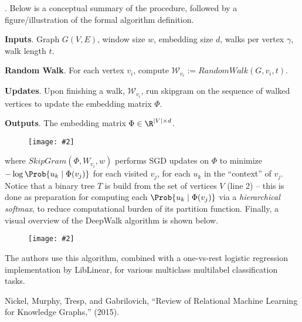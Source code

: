 \documentclass[11pt]{article}
\newcommand\myfig[2][0.3\textwidth]{\begin{figure}[h!]\centering\texttt{[image: \#2]}\end{figure}}
\newcommand\myspace[1][]{\vspace{#1\bigskipamount}}
\newcommand\p{\Needspace{10\baselineskip} \noindent}
\begin{document}
\myspace
\p {}. Below is a conceptual summary of the procedure, followed by a figure/illustration of the formal algorithm definition.
\begin{compactenum}
	\item \textbf{Inputs}. Graph $G(V, E)$, window size $w$, embedding size $d$, walks per vertex $\gamma$, walk length $t$. 
	
	\item \textbf{Random Walk}. For each vertex $v_i$, compute $\mathcal{W}_{v_i} := RandomWalk(G, v_i, t)$. 
	
	\item \textbf{Updates}. Upon finishing a walk, $\mathcal{W}_{v_i}$, run skipgram on the sequence of walked vertices to update the embedding matrix $\Phi$. 
	
	\item \textbf{Outputs}. The embedding matrix $\Phi \in \R^{|V| \times d}$. 
\end{compactenum}

\myfig[0.6\textwidth]{deepwalk_algo.png}

where $SkipGram(\Phi, W_{v_i}, w)$ performs SGD updates on $\Phi$ to minimize $-\log\Prob{u_k \mid \Phi(v_j)}$ for each visited $v_j$, for each $u_k$ in the ``context'' of $v_j$. Notice that a binary tree $T$ is build from the set of vertices $V$ (line 2) -- this is done as preparation for computing each $\Prob{u_k \mid \Phi(v_j)}$ via a \textit{hierarchical softmax}, to reduce computational burden of its partition function. Finally, a visual overview of the DeepWalk algorithm is shown below.
\myfig[0.8\textwidth]{deepwalk_vis.png}
The authors use this algorithm, combined with a one-vs-rest logistic regression implementation by LibLinear, for various multiclass multilabel classification tasks.  





\vspace{-1em}
{\footnotesize Nickel, Murphy, Tresp, and Gabrilovich, ``Review of Relational Machine Learning for Knowledge Graphs,'' (2015).}
\end{document}
